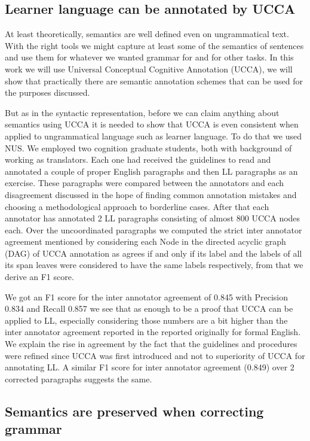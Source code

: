\documentclass[english]{article}
\begin{document}
\subsection{Learner language can be annotated by UCCA}

At least theoretically, semantics are well defined even on ungrammatical
text. With the right tools we might capture at least some of the semantics
of sentences and use them for whatever we wanted grammar for and for
other tasks. In this work we will use Universal Conceptual Cognitive
Annotation (UCCA)\cite{abend2013universal}, we will show that practically
there are semantic annotation schemes that can be used for the purposes
discussed.

But as in the syntactic representation, before we can claim anything
about semantics using UCCA it is needed to show that UCCA is even
consistent when applied to ungrammatical language such as learner
language. To do that we used NUS\cite{dahlmeier2013building}. We employed two cognition graduate students, both
with background of working as translators. Each
one had received the guidelines to read and annotated a couple of
proper English paragraphs and then LL paragraphs as
an exercise. These paragraphs were compared between the annotators
and each disagreement discussed in the hope of finding common annotation
mistakes and choosing a methodological approach to borderline cases.
After that each annotator has annotated 2 LL paragraphs
consisting of almost 800 UCCA nodes each. Over the uncoordinated paragraphs
we computed the strict inter annotator agreement mentioned by \cite{abend2013universal}
considering each Node in the directed acyclic graph (DAG) of UCCA
annotation as agrees if and only if its label and the labels of all
its span leaves were considered to have the same labels respectively,
from that we derive an F1 score. 

We got an F1 score for the inter annotator agreement of 0.845 with
Precision 0.834 and Recall 0.857 we see that as enough to be a proof
that UCCA can be applied to LL, especially considering those numbers
are a bit higher than the inter annotator agreement reported in the
reported originally for formal English\cite{abend2013universal}.
We explain the rise in agreement by the fact that the guidelines and
procedures were refined since UCCA was first introduced and not to
superiority of UCCA for annotating LL. A similar F1
score for inter annotator agreement (0.849) over 2 corrected paragraphs
suggests the same.

\subsection{Semantics are preserved when correcting grammar}
\end{document}
